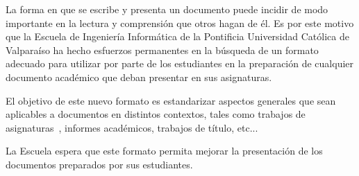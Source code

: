 

La forma en que se escribe y presenta un documento puede incidir de modo
importante en la lectura y comprensión que otros hagan de él. Es por este motivo
que la Escuela de Ingeniería Informática de la Pontificia Universidad Católica
de Valparaíso ha hecho esfuerzos permanentes en la búsqueda de un formato
adecuado para utilizar por parte de los estudiantes en la preparación de
cualquier documento académico que deban presentar en sus asignaturas.

El objetivo de este nuevo formato es estandarizar aspectos generales que sean
aplicables a documentos en distintos contextos, tales como trabajos de
asignaturas~\cite{AptCambridge2003,AptTOPLAS1998}, informes académicos,
trabajos de título, etc...

La Escuela espera que este formato permita mejorar la presentación de los
documentos preparados por sus estudiantes.


